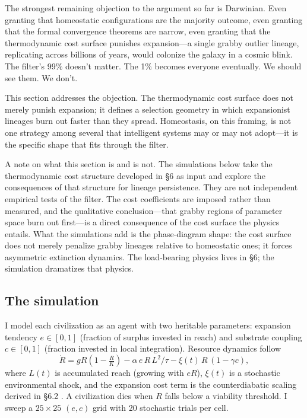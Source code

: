 \documentclass[11pt,twocolumn]{article}
\begin{document}
The strongest remaining objection to the argument so far is Darwinian. Even
granting that homeostatic configurations are the majority outcome, even
granting that the formal convergence theorems are narrow, even granting
that the thermodynamic cost surface punishes expansion—a single grabby
outlier lineage, replicating across billions of years, would colonize the
galaxy in a cosmic blink. The filter's 99\% doesn't matter. The 1\% becomes
everyone eventually. We should see them. We don't.

This section addresses the objection. The thermodynamic cost surface does
not merely punish expansion; it defines a selection geometry in which
expansionist lineages burn out faster than they spread. Homeostasis, on
this framing, is not one strategy among several that intelligent systems
may or may not adopt—it is the specific shape that fits through the filter.

A note on what this section is and is not. The simulations below take the
thermodynamic cost structure developed in \S 6 as input and explore the
consequences of that structure for lineage persistence. They are not
independent empirical tests of the filter. The cost coefficients are
imposed rather than measured, and the qualitative conclusion—that grabby
regions of parameter space burn out first—is a direct consequence of the
cost surface the physics entails. What the simulations add is the
phase-diagram shape: the cost surface does not merely penalize grabby
lineages relative to homeostatic ones; it forces asymmetric extinction
dynamics. The load-bearing physics lives in \S 6; the simulation
dramatizes that physics.

\subsection{The simulation}

I model each civilization as an agent with two heritable parameters:
expansion tendency $e \in [0,1]$ (fraction of surplus invested in reach)
and substrate coupling $c \in [0,1]$ (fraction invested in local
integration). Resource dynamics follow
\begin{equation}
\dot R = gR\!\left(1-\tfrac{R}{K}\right) - \alpha\,e\,R\,L^{2}/\tau
        - \xi(t)\,R\,(1-\gamma c),
\label{eq:agentdyn}
\end{equation}
where $L(t)$ is accumulated reach (growing with $eR$), $\xi(t)$ is a
stochastic environmental shock, and the expansion cost term is the
counterdiabatic scaling derived in \S 6.2 \citep{Boyd2022,SivakCrooks2012}.
A civilization dies when $R$ falls below a viability threshold. I sweep a
$25 \times 25$ $(e,c)$ grid with 20 stochastic trials per cell.
\end{document}
